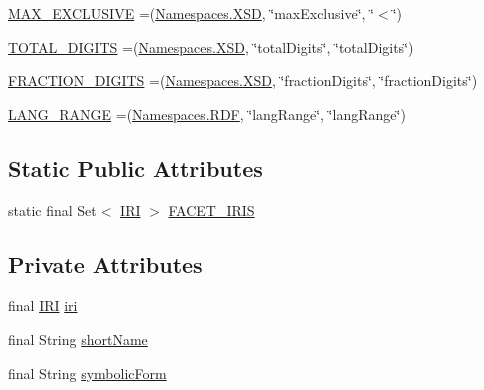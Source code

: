\begin{DoxyCompactItemize}
\item 
\hyperlink{enumorg_1_1semanticweb_1_1owlapi_1_1vocab_1_1_o_w_l_facet_aeb6a9174b60549039a19540cae7d3525}{M\-A\-X\-\_\-\-E\-X\-C\-L\-U\-S\-I\-V\-E} =(\hyperlink{enumorg_1_1semanticweb_1_1owlapi_1_1vocab_1_1_namespaces_ad23159b4298d8448c5af25510c8c7f13}{Namespaces.\-X\-S\-D}, \char`\"{}max\-Exclusive\char`\"{}, \char`\"{}$<$\char`\"{})
\item 
\hyperlink{enumorg_1_1semanticweb_1_1owlapi_1_1vocab_1_1_o_w_l_facet_a32dea2032eeb9880d49454392328a731}{T\-O\-T\-A\-L\-\_\-\-D\-I\-G\-I\-T\-S} =(\hyperlink{enumorg_1_1semanticweb_1_1owlapi_1_1vocab_1_1_namespaces_ad23159b4298d8448c5af25510c8c7f13}{Namespaces.\-X\-S\-D}, \char`\"{}total\-Digits\char`\"{}, \char`\"{}total\-Digits\char`\"{})
\item 
\hyperlink{enumorg_1_1semanticweb_1_1owlapi_1_1vocab_1_1_o_w_l_facet_a713f022413e4446eb25bd25843838df8}{F\-R\-A\-C\-T\-I\-O\-N\-\_\-\-D\-I\-G\-I\-T\-S} =(\hyperlink{enumorg_1_1semanticweb_1_1owlapi_1_1vocab_1_1_namespaces_ad23159b4298d8448c5af25510c8c7f13}{Namespaces.\-X\-S\-D}, \char`\"{}fraction\-Digits\char`\"{}, \char`\"{}fraction\-Digits\char`\"{})
\item 
\hyperlink{enumorg_1_1semanticweb_1_1owlapi_1_1vocab_1_1_o_w_l_facet_a18ba4fd7c449c54c53347fc0a45232e8}{L\-A\-N\-G\-\_\-\-R\-A\-N\-G\-E} =(\hyperlink{enumorg_1_1semanticweb_1_1owlapi_1_1vocab_1_1_namespaces_a0d1c7991e82e2b5c495bb87f1123ce30}{Namespaces.\-R\-D\-F}, \char`\"{}lang\-Range\char`\"{}, \char`\"{}lang\-Range\char`\"{})
\end{DoxyCompactItemize}
\subsection*{Static Public Attributes}
\begin{DoxyCompactItemize}
\item 
static final Set$<$ \hyperlink{classorg_1_1semanticweb_1_1owlapi_1_1model_1_1_i_r_i}{I\-R\-I} $>$ \hyperlink{enumorg_1_1semanticweb_1_1owlapi_1_1vocab_1_1_o_w_l_facet_ac066095fe8f753b3b63e0923a2ec3c9f}{F\-A\-C\-E\-T\-\_\-\-I\-R\-I\-S}
\end{DoxyCompactItemize}
\subsection*{Private Attributes}
\begin{DoxyCompactItemize}
\item 
final \hyperlink{classorg_1_1semanticweb_1_1owlapi_1_1model_1_1_i_r_i}{I\-R\-I} \hyperlink{enumorg_1_1semanticweb_1_1owlapi_1_1vocab_1_1_o_w_l_facet_a13149924b7bc8978492c7c4e83aeff86}{iri}
\item 
final String \hyperlink{enumorg_1_1semanticweb_1_1owlapi_1_1vocab_1_1_o_w_l_facet_a11866bbbe812f44e207fabbf8caa75b8}{short\-Name}
\item 
final String \hyperlink{enumorg_1_1semanticweb_1_1owlapi_1_1vocab_1_1_o_w_l_facet_a99a2d7c0adde6f2bf6b87fdf7c66e20e}{symbolic\-Form}
\end{DoxyCompactItemize}


